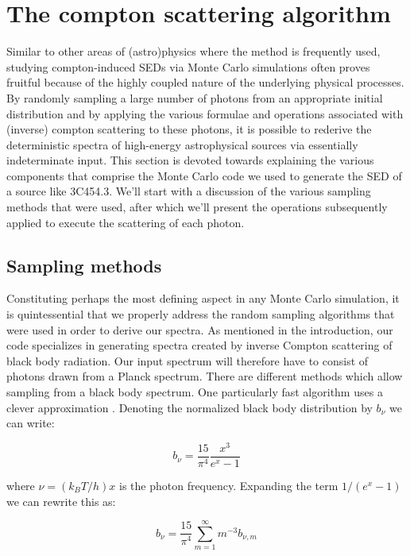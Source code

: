 \documentclass{article}
\begin{document}
\section{The compton scattering algorithm}
    Similar to other areas of (astro)physics where the method is frequently used, studying compton-induced SEDs via Monte Carlo simulations often proves fruitful because of the highly coupled nature of the underlying physical processes. By randomly sampling a large number of photons from an appropriate initial distribution and by applying the various formulae and operations associated with (inverse) compton scattering to these photons, it is possible to rederive the deterministic spectra of high-energy astrophysical sources via essentially indeterminate input. This section is devoted towards explaining the various components that comprise the Monte Carlo code we used to generate the SED of a source like 3C454.3. We'll start with a discussion of the various sampling methods that were used, after which we'll present the operations subsequently applied to execute the scattering of each photon.

    \subsection{Sampling methods}
        Constituting perhaps the most defining aspect in any Monte Carlo simulation, it is quintessential that we properly address the random sampling algorithms that were used in order to derive our spectra. As mentioned in the introduction, our code specializes in generating spectra created by inverse Compton scattering of black body radiation. Our input spectrum will therefore have to consist of photons drawn from a Planck spectrum. There are different methods which allow sampling from a black body spectrum. One particularly fast algorithm uses a clever approximation \cite{Carter1975, Pozdnyakov1983}. Denoting the normalized black body distribution by $b_\nu$ we can write:
    
            \begin{equation}
                b_\nu = \frac{15}{\pi^4} \frac{x^3}{e^x - 1}
            \end{equation} \label{eq:BB}

        where $\nu = (k_B T / h) x$ is the photon frequency. Expanding the term $1/(e^x -1)$ we can rewrite this as:

            \begin{equation}
                b_\nu = \frac{15}{\pi^4} \sum_{m=1}^{\infty} m^{-3} b_{\nu,m}
            \end{equation}
        
\end{document}
